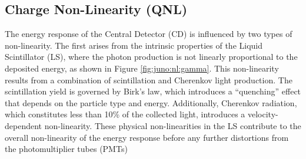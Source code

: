 \documentclass[../main.tex]{subfiles}
\begin{document}
%
%
%
%
%
%

\subsection{Charge Non-Linearity (QNL)}
\label{sec:joint_fit:qnl}

The energy response of the Central Detector (CD) is influenced by two types of non-linearity. The first arises from the intrinsic properties of the Liquid Scintillator (LS), where the photon production is not linearly proportional to the deposited energy, as shown in Figure \ref{fig:juno:nl:gamma}. This non-linearity results from a combination of scintillation and Cherenkov light production. The scintillation yield is governed by Birk's law, which introduces a ``quenching'' effect that depends on the particle type and energy. Additionally, Cherenkov radiation, which constitutes less than 10\% of the collected light, introduces a velocity-dependent non-linearity. These physical non-linearities in the LS contribute to the overall non-linearity of the energy response before any further distortions from the photomultiplier tubes (PMTs)
\end{document}
